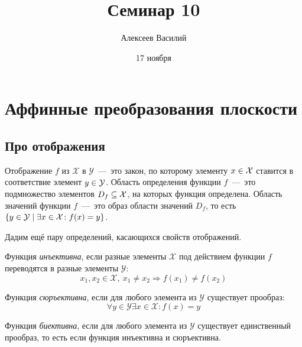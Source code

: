 \documentclass[a4paper,12pt]{article}
\author{Алексеев Василий}
\title{Семинар 10}
\date{17 ноября} %
\begin{document}
  \maketitle
  
  \tableofcontents

  \thispagestyle{empty}
  
  \newpage
  


  \section{Аффинные преобразования плоскости}
  
  \subsection{Про отображения}
  
  Отображение $f$ из $\mathcal X$ в $\mathcal Y$~---~это закон, по которому элементу $x \hm\in \mathcal X$ ставится в соответствие элемент $y \hm\in \mathcal Y$.
  Область определения функции $f$~---~это подмножество элементов $D_f \hm\subseteq \mathcal X$, на которых функция определена.  %
  Область значений функции $f$~---~это образ области значений $D_f$, то есть $\{y \hm\in \mathcal Y \hm\mid \exists x \hm\in \mathcal X\colon f(x) \hm= y\}$.
  
  Дадим ещё пару определений, касающихся свойств отображений.
  
  \begin{definition}[Инъекция]
    Функция \emph{инъективна}, если разные элементы $\mathcal X$ под действием функции $f$ переводятся в разные элементы $\mathcal Y$:
    \[
      x_1, x_2 \in \mathcal X,\ x_1 \not= x_2 \Rightarrow f(x_1) \not= f(x_2)
    \]
  \end{definition}
  
  \begin{definition}[Сюръекция]
    Функция \emph{сюръективна}, если для любого элемента из $\mathcal Y$ существует прообраз:
    \[
      \forall y \in \mathcal Y \exists x \in \mathcal X\colon f(x) = y
    \]
  \end{definition}
  
  \begin{definition}[Биекция]
    Функция \emph{биективна}, если для любого элемента из $\mathcal Y$ существует единственный прообраз, то есть если функция инъективна и сюръективна.
  \end{definition}
  
\end{document}
